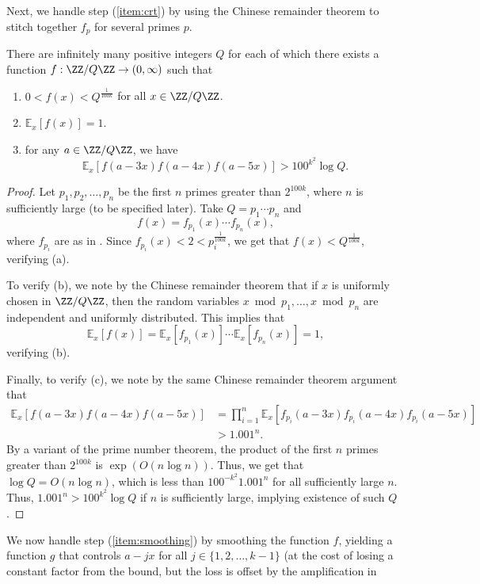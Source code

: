\documentclass[11pt,reqno]{amsart}
\begin{document}
Next, we handle step (\ref{item:crt})
by using the Chinese remainder theorem to stitch together 
$f_p$ for several primes $p$.
\begin{lemma}
\label{lem:crt}
There are infinitely many positive integers $Q$ 
for each of which there exists 
a function $f : \ZZ/Q\ZZ \to (0,\infty)$ such that 
\begin{enumerate}[label=(\alph*)]
\item $0<f(x) < Q^{\frac 1{100k}}$ for all $x\in \ZZ/Q\ZZ$.
\item $\mathbb E_x[f(x)] = 1$.
\item for any $a\in \ZZ/Q\ZZ$, we have
$$\mathbb E_x[f(a-3x)f(a-4x)f(a-5x)] > 100^{k^2}\log Q.$$
\end{enumerate}
\end{lemma}
\begin{proof}
Let $p_1,p_2,\dots,p_n$ be the first $n$ primes 
greater than $2^{100k}$,
where $n$ is sufficiently large (to be specified later).
Take $Q=p_1\cdots p_n$ and 
$$f(x) = f_{p_1}(x) \cdots f_{p_n}(x),$$
where $f_{p_i}$ are as in .
Since $f_{p_i}(x) < 2 < p_i^{\frac 1{100k}}$,
we get that $f(x) < Q^{\frac 1{100k}}$, verifying (a).

To verify (b), we note by the Chinese remainder theorem 
that if $x$ is uniformly chosen in $\ZZ/Q\ZZ$,
then the random variables $x\bmod p_1, \dots, x\bmod p_n$ 
are independent and uniformly distributed. This implies that
$$\mathbb E_x[f(x)] = \mathbb E_x[f_{p_1}(x)] 
\cdots \mathbb E_x[f_{p_n}(x)] = 1,$$
verifying (b).

Finally, to verify (c), we note by the same 
Chinese remainder theorem argument that 
\begin{align*}
    \mathbb E_x[f(a-3x)f(a-4x)f(a-5x)]
    &= \prod_{i=1}^n \mathbb E_x[f_{p_i}(a-3x)f_{p_i}(a-4x)
    f_{p_i}(a-5x)] \\
    &> 1.001^n.
\end{align*}
By a variant of the prime number theorem,
the product of the first $n$ primes greater than $2^{100k}$
is $\exp(O(n\log n))$.
Thus, we get that $\log Q = O(n\log n)$,
which is less than $100^{-k^2} 1.001^n$ for all sufficiently large $n$.
Thus, $1.001^n > 100^{k^2}\log Q$ if $n$ is sufficiently large,
implying existence of such $Q$.
\end{proof}
We now handle step (\ref{item:smoothing}) by smoothing the function $f$,
yielding a function $g$ that controls $a-jx$ 
for all $j\in\{1,2,\dots,k-1\}$
(at the cost of losing a constant factor from the bound,
but the loss is offset by the amplification in 
\end{document}

